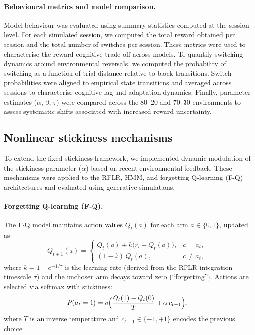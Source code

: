 \documentclass[11pt, reprint, aps, prl]{revtex4-2}
\begin{document}
\paragraph{\textbf{Behavioural metrics and model comparison.}}
Model behaviour was evaluated using summary statistics computed at the session level. For each simulated session, we computed the total reward obtained per session and the total number of switches per session. These metrics were used to characterise the reward-cognitive trade-off across models. To quantify switching dynamics around environmental reversals, we computed the probability of switching as a function of trial distance relative to block transitions. Switch probabilities were aligned to empirical state transitions and averaged across sessions to characterise cognitive lag and adaptation dynamics. Finally, parameter estimates (\(\alpha\), \(\beta\), \(\tau\)) were compared across the 80--20 and 70--30 environments to assess systematic shifts associated with increased reward uncertainty. 

\subsection{Nonlinear stickiness mechanisms}
To extend the fixed-stickiness framework, we implemented dynamic modulation of the stickiness parameter ($\alpha$) based on recent environmental feedback. These mechanisms were applied to the RFLR, HMM, and forgetting Q-learning (F-Q) architectures and evaluated using generative simulations.

\paragraph{Forgetting Q-learning (F-Q).}
The F-Q model maintains action values $Q_t(a)$ for each arm $a\in\{0,1\}$, updated as
\begin{equation}
Q_{t+1}(a) =
\begin{cases}
Q_t(a) + k\bigl(r_t - Q_t(a)\bigr), & a = a_t,\\[4pt]
(1-k)\,Q_t(a), & a \neq a_t,
\end{cases}
\end{equation}
where $k = 1 - e^{-1/\tau}$ is the learning rate (derived from the RFLR integration timescale $\tau$) and the unchosen arm decays toward zero (``forgetting''). Actions are selected via softmax with stickiness:
\[
P(a_t=1) = \sigma\!\Bigl(\frac{Q_t(1)-Q_t(0)}{T} + \alpha\,c_{t-1}\Bigr),
\]
where $T$ is an inverse temperature and $c_{t-1}\in\{-1,+1\}$ encodes the previous choice.
\end{document}
